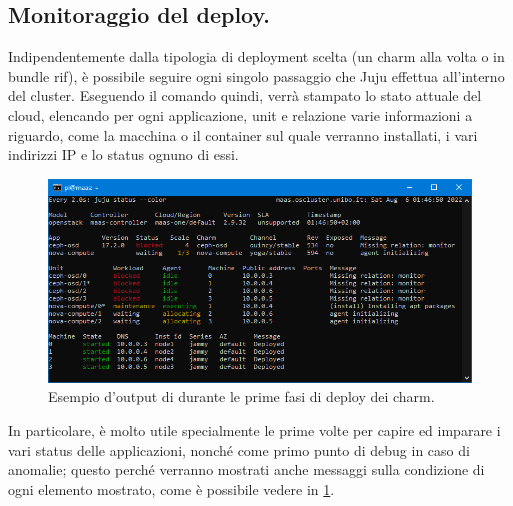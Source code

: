 


    
\subsection{Monitoraggio del deploy.}
Indipendentemente dalla tipologia di deployment scelta (un charm alla volta o in bundle rif), è possibile seguire ogni singolo passaggio che Juju effettua all'interno del cluster.
% 
Eseguendo il comando  quindi, verrà stampato lo stato attuale del cloud, elencando per ogni applicazione, unit e relazione varie informazioni a riguardo, come la macchina o il container sul quale verranno installati, i vari indirizzi IP e lo status ognuno di essi.

\begin{figure}[H]
    \centering
    \includegraphics[width=1\linewidth]{tesi/files/immagini/openstack/es_juju_status.png}
    \caption{Esempio d'output di  durante le prime fasi di deploy dei charm.}
    \label{fig:openstack_es_status}
\end{figure}

\bigskip\noindent
In particolare, è molto utile specialmente le prime volte per capire ed imparare i vari status delle applicazioni, nonché come primo punto di debug in caso di anomalie; 
% 
questo perché verranno mostrati anche messaggi sulla condizione di ogni elemento mostrato, come è possibile vedere in \cref{fig:openstack_es_status}.

